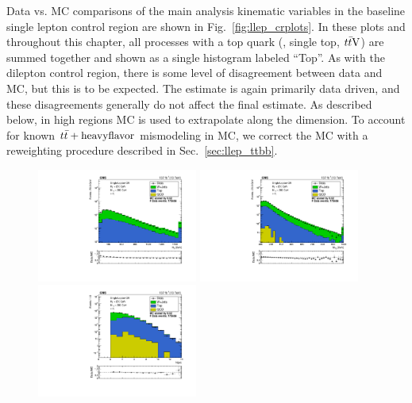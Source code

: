 Data vs. MC comparisons of the main analysis kinematic variables in the baseline single lepton
control region are shown in Fig.~\ref{fig:llep_crplots}. In these plots and throughout this
chapter, all processes with a top quark (\ttbar, single top, $t\bar{t}\mathrm{V}$) are summed together
and shown as a single histogram labeled ``Top''. As with the dilepton control region,
there is some level of disagreement between data and MC, but this is to be expected. The 
estimate is again primarily data driven, and these disagreements generally do not affect the
final estimate. As described below, in high \Nj regions MC is used to extrapolate along the
\Nb dimension. To account for known $t\bar{t}+\mathrm{heavy flavor}$ mismodeling in MC, we correct the MC 
with a reweighting procedure described in Sec.~\ref{sec:llep_ttbb}.

\begin{figure}[ht]
  \begin{center}
    \includegraphics[width=0.47\textwidth]{figs/llep/crslbase_ht.pdf}
    \includegraphics[width=0.47\textwidth]{figs/llep/crslbase_mt2.pdf} \\
    \includegraphics[width=0.47\textwidth]{figs/llep/crslbase_nJet30.pdf}

\end{center}
\end{figure}
